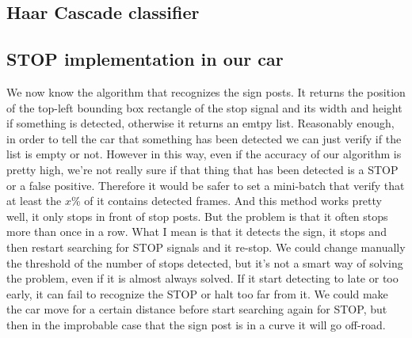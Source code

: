 \documentclass[12pt,a4paper]{article}
\begin{document}
\begin{large}
\subsection{Haar Cascade classifier}

\subsection{}

\subsection{}

\subsection{STOP implementation in our car}
We now know the algorithm that recognizes the sign posts. It returns the position of the top-left bounding box rectangle of the stop signal and its width and height if something is detected, otherwise it returns an emtpy list. Reasonably enough, in order to tell the car that something has been detected we can just verify if the list is empty or not. However in this way, even if the accuracy of our algorithm is pretty high, we're not really sure if that thing that has been detected is a STOP or a false positive. Therefore it would be safer to set a mini-batch that verify that at least the $x$\% of it contains detected frames. And this method works pretty well, it only stops in front of stop posts. But the problem is that it often stops more than once in a row. What I mean is that it detects the sign, it stops and then restart searching for STOP signals and it re-stop. We could change manually the threshold of the number of stops detected, but it's not a smart way of solving the problem, even if it is almost always solved. If it start detecting to late or too early, it can fail to recognize the STOP or halt too far from it. We could make the car move for a certain distance before start searching again for STOP, but then in the improbable case that the sign post is in a curve it will go off-road.

\end{large}
\end{document}
